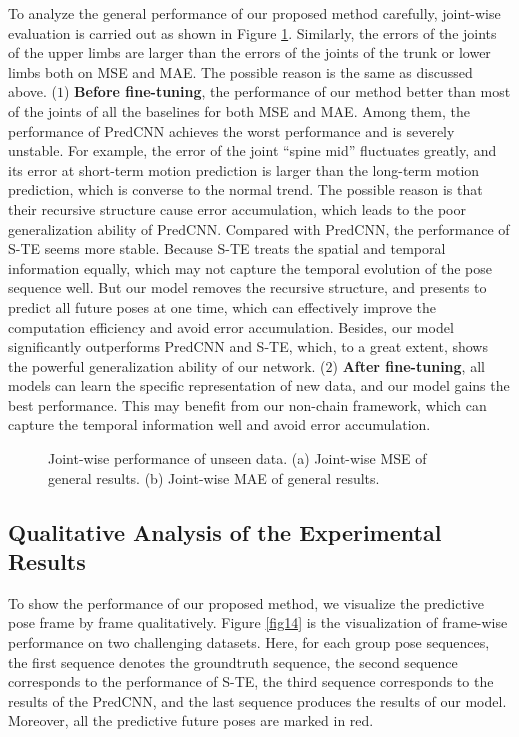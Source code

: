 \documentclass[journal]{IEEEtran}
\begin{document}
To analyze the general performance of our proposed method carefully, joint-wise evaluation is carried out as shown in Figure \ref{fig13}. Similarly, the errors of the joints of the upper limbs are larger than the errors of the joints of the trunk or lower limbs both on MSE and MAE. The possible reason is the same as discussed above. (${1}$) {\bf Before fine-tuning}, the performance of our method better than most of the joints of all the baselines for both MSE and MAE. Among them, the performance of PredCNN achieves the worst performance and is severely unstable. For example, the error of the joint ``spine mid'' fluctuates greatly, and its error at short-term motion prediction is larger than the long-term motion prediction, which is converse to the normal trend. The possible reason is that their recursive structure cause error accumulation, which leads to the poor generalization ability of PredCNN. Compared with PredCNN, the performance of S-TE seems more stable. Because S-TE treats the spatial and temporal information equally, which may not capture the temporal evolution of the pose sequence well. But our model removes the recursive structure, and presents to predict all future poses at one time, which can effectively improve the computation efficiency and avoid error accumulation. Besides, our model significantly outperforms PredCNN and S-TE, which, to a great extent, shows the powerful generalization ability of our network. (${2}$) {\bf After fine-tuning}, all models can learn the specific representation of new data, and our model gains the best performance. This may benefit from our non-chain framework, which can capture the temporal information well and avoid error accumulation.

\begin{figure}[!t]
\centering
{}
\hfil
{}
\caption{ Joint-wise performance of unseen data. (a) Joint-wise MSE of general results. (b) Joint-wise MAE of general results. }
\label{fig13}
\end{figure}


\subsection{Qualitative Analysis of the Experimental Results}
To show the performance of our proposed method, we visualize the predictive pose frame by frame qualitatively. Figure \ref{fig14} is the visualization of frame-wise performance on two challenging datasets. Here, for each group pose sequences, the first sequence denotes the groundtruth sequence, the second sequence corresponds to the performance of S-TE, the third sequence corresponds to the results of the PredCNN, and the last sequence produces the results of our model. Moreover, all the predictive future poses are marked in red.
\end{document}
